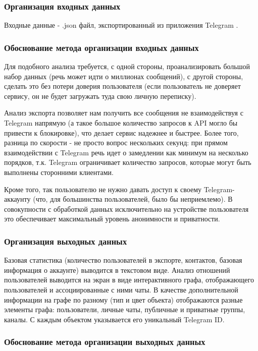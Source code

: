 \subsubsection{Организация входных данных}

Входные данные - .json файл, экспортированный из приложения Telegram \cite{telegramExport}.

\subsubsection{Обоснование метода организации входных данных}

Для подобного анализа требуется, с одной стороны, проанализировать большой набор данных (речь может идти о миллионах сообщений),
с другой стороны, сделать это без потери доверия пользователя (если пользователь не доверяет сервису, он не будет загружать туда свою личную переписку).

Анализ экспорта позволяет нам получить все сообщения не взаимодействуя с Telegram напрямую (а такое большое количество запросов к API могло бы привести к блокировке), что делает сервис надежнее и быстрее.
Более того, разница по скорости - не просто вопрос нескольких секунд: при прямом взаимодействии с Telegram речь идет о замедлении как минимум на несколько порядков, т.к. Telegram ограничивает количество запросов, которые могут быть выполнены сторонними клиентами.

Кроме того, так пользователю не нужно давать доступ к своему Telegram-аккаунту (что, для большинства пользователей, было бы неприемлемо). 
В совокупности с обработкой данных исключительно на устройстве пользователя это обеспечивает максимальный уровень анонимности и приватности.

\subsubsection{Организация выходных данных}

Базовая статистика (количество пользователей в экспорте, контактов, базовая информация о аккаунте) выводится в текстовом виде.
Анализ отношений пользователей выводится на экран в виде интерактивного графа, отображающего пользователей и ассоциированные с ними чаты.
В качестве дополнительной информации на графе по разному (тип и цвет объекта) отображаются разные элементы графа: пользователи, личные чаты, публичные и приватные группы, каналы.
С каждым объектом указывается его уникальный Telegram ID.

\subsubsection{Обоснование метода организации выходных данных}

